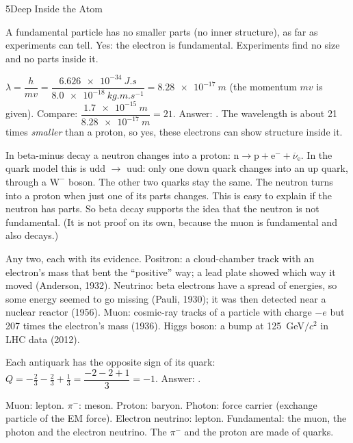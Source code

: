 \begin{chapteranswers}{5}{Deep Inside the Atom}
  \item A fundamental particle has no smaller parts (no inner structure), as far as
        experiments can tell. Yes: the electron is fundamental. Experiments find no size
        and no parts inside it.
  \item $\lambda = \dfrac{h}{mv} = \dfrac{\qty{6.626e-34}{J.s}}{\qty{8.0e-18}{kg.m.s^{-1}}}
        = \qty{8.28e-17}{m}$ (the momentum $mv$ is given). Compare:
        $\dfrac{\qty{1.7e-15}{m}}{\qty{8.28e-17}{m}} = 21$. Answer:
        . The wavelength is about 21 times
        \emph{smaller} than a proton, so yes, these electrons can show structure inside it.
  \item In beta-minus decay a neutron changes into a proton:
        $\mathrm{n} \to \mathrm{p} + \mathrm{e}^- + \overline{\nu}_\mathrm{e}$. In the
        quark model this is udd $\to$ uud: only one down quark changes into an up quark,
        through a $\mathrm{W}^-$ boson. The other two quarks stay the same. The neutron
        turns into a proton when just one of its parts changes. This is easy to explain if
        the neutron has parts. So beta decay supports the idea that the neutron is not
        fundamental. (It is not proof on its own, because the muon is fundamental and also
        decays.)
  \item Any two, each with its evidence. Positron: a cloud-chamber track with an
        electron's mass that bent the ``positive'' way; a lead plate showed which way it
        moved (Anderson, 1932). Neutrino: beta electrons have a spread of energies, so
        some energy seemed to go missing (Pauli, 1930); it was then detected near a
        nuclear reactor (1956). Muon: cosmic-ray tracks of a particle with charge $-e$ but
        207 times the electron's mass (1936). Higgs boson: a bump at
        \qty{125}{GeV}$/c^2$ in LHC data (2012).
  \item Each antiquark has the opposite sign of its quark:
        $Q = -\tfrac23 - \tfrac23 + \tfrac13 = \dfrac{-2 - 2 + 1}{3} = -1$.
        Answer: .
  \item Muon: lepton. $\pi^-$: meson. Proton: baryon. Photon: force carrier (exchange
        particle of the EM force). Electron neutrino: lepton. Fundamental: the muon, the
        photon and the electron neutrino. The $\pi^-$ and the proton are made of quarks.

\end{chapteranswers}

